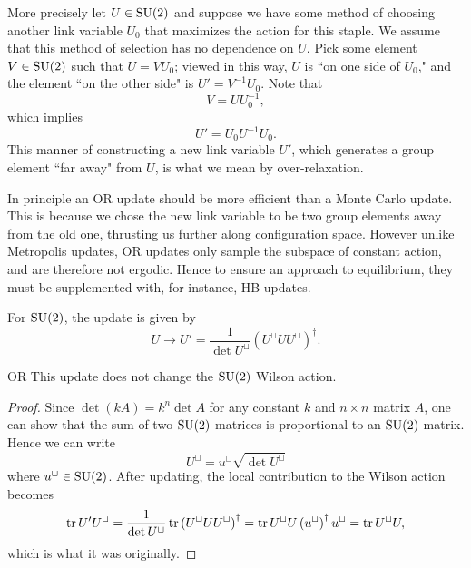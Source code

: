 More precisely let $U\in\operatorname{SU}(2)$ and suppose we have some method of
choosing another link variable $U_0$ that maximizes
the action for this staple.  We assume that this method of selection has no
dependence on $U$.  Pick some element $V\in\operatorname{SU}(2)$ such that $U=VU_0$; viewed
in this way, $U$ is ``on one side of $U_0$," and the element 
``on the other side" is $U'=V^{-1}U_0$.  Note that
\begin{equation}
  V=U U_0^{-1},
\end{equation}
which implies
\begin{equation}
  U' = U_0 U^{-1} U_0.
\end{equation}
This manner of constructing a new link variable $U'$, which generates
a group element ``far away" from $U$, is what we mean by over-relaxation.

In principle an OR update should be more efficient than a Monte
Carlo update. This is because we chose the new link variable to be two
group elements away from the old one, thrusting us further
along configuration space. However unlike Metropolis updates, OR updates 
only sample the subspace of constant action, and are therefore not ergodic. 
Hence to ensure an approach to equilibrium, they must be supplemented with, 
for instance, HB updates.

For $\operatorname{SU}(2)$, the update is given by
\begin{equation}\label{eq:ORupdate}
  U\to U'=\frac{1}{\det U^\sqcup}\left(U^\sqcup UU^\sqcup\right)^\dagger.
\end{equation}
\begin{proposition}{}{OR}\label{prp:OR}
  This update does not change the $\operatorname{SU}(2)$ Wilson action.
  \begin{proof}
   Since $\det(kA)=k^n\det A$ for any constant $k$ and $n\times n$ matrix $A$,
   one can show that the sum of two $\operatorname{SU}(2)$ matrices is proportional
   to an $\operatorname{SU}(2)$ matrix. Hence we can write
    $$
      U^\sqcup=u^\sqcup\sqrt{\det U^\sqcup}
    $$
    where $u^\sqcup\in\operatorname{SU}(2)$. After updating, the local contribution
    to the Wilson action becomes
    \begin{equation*}
      \tr U'U^\sqcup =\frac{1}{\det U^\sqcup}\tr
                       \left(U^\sqcup UU^\sqcup\right)^\dagger
                     =\tr U^\sqcup U\left(u^\sqcup\right)^\dagger u^\sqcup
                     =\tr U^\sqcup U,
    \end{equation*}
    which is what it was originally.
  \end{proof}
\end{proposition}

